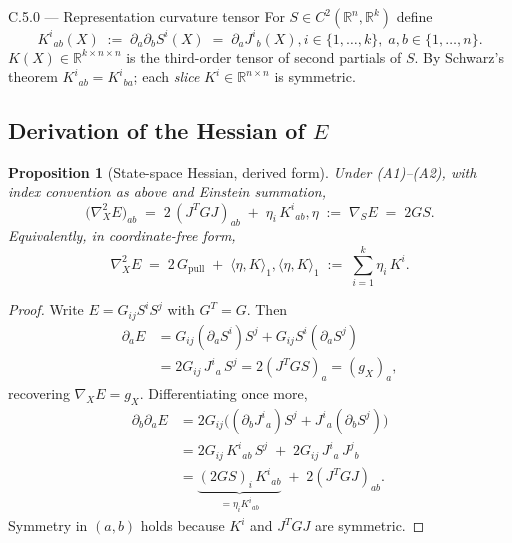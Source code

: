 \documentclass[11pt,oneside]{amsart}
\def\qquad{ }%
\theoremstyle{plain}
\newtheorem{proposition}[theorem]{Proposition}
\theoremstyle{definition}
\newcommand{\Gpull}{G_{\mathrm{pull}}}
\newcommand{\R}{\mathbb{R}}
\begin{document}
\begin{defbox}{C.5.0 --- Representation curvature tensor}
For $S\in C^{2}(\R^{n},\R^{k})$ define
\[
  K^{i}{}_{ab}(X) \;:=\; \partial_{a}\partial_{b} S^{i}(X)
                 \;=\; \partial_{a} J^{i}{}_{b}(X),
  \qquad
  i\in\{1,\dots,k\},\; a,b\in\{1,\dots,n\}.
\]
$K(X)\in\R^{k\times n\times n}$ is the third-order tensor of second
partials of $S$. By Schwarz's theorem $K^{i}{}_{ab}=K^{i}{}_{ba}$;
each \emph{slice} $K^{i}\in\R^{n\times n}$ is symmetric.
\end{defbox}

\subsection*{Derivation of the Hessian of \texorpdfstring{$E$}{E}}

\begin{proposition}[State-space Hessian, derived form]
\label{prop:hessian}
Under \textup{(A1)--(A2)}, with index convention as above and Einstein
summation,
\[
  \boxed{\;\bigl(\nabla^{2}_{X}E\bigr)_{ab}
  \;=\; 2\,(J^{T}GJ)_{ab} \;+\; \eta_{i}\,K^{i}{}_{ab},
  \qquad
  \eta \;:=\; \nabla_{S}E \;=\; 2GS.\;}
\]
Equivalently, in coordinate-free form,
\[
  \nabla^{2}_{X}E \;=\; 2\,\Gpull \;+\; \langle\eta,K\rangle_{1},
  \qquad
  \langle\eta,K\rangle_{1} \;:=\; \sum_{i=1}^{k}\eta_{i}\,K^{i}.
\]
\end{proposition}

\begin{proof}
Write $E = G_{ij}S^{i}S^{j}$ with $G^{T}=G$. Then
\begin{align*}
  \partial_{a}E
  &= G_{ij}(\partial_{a}S^{i})S^{j} + G_{ij}S^{i}(\partial_{a}S^{j}) \\
  &= 2 G_{ij}\,J^{i}{}_{a}\,S^{j}
  = 2(J^{T}GS)_{a}
  = (g_{X})_{a},
\end{align*}
recovering $\nabla_{X}E = g_{X}$. Differentiating once more,
\begin{align*}
  \partial_{b}\partial_{a}E
  &= 2 G_{ij}\bigl((\partial_{b}J^{i}{}_{a})S^{j}
                  + J^{i}{}_{a}(\partial_{b}S^{j})\bigr) \\
  &= 2 G_{ij}\,K^{i}{}_{ab}\,S^{j}
   \;+\; 2 G_{ij}\,J^{i}{}_{a}\,J^{j}{}_{b} \\
  &= \underbrace{(2GS)_{i}\,K^{i}{}_{ab}}_{=\eta_{i} K^{i}{}_{ab}}
   \;+\; 2(J^{T}GJ)_{ab}.
\end{align*}
Symmetry in $(a,b)$ holds because $K^{i}$ and $J^{T}GJ$ are symmetric.
\end{proof}
\end{document}

